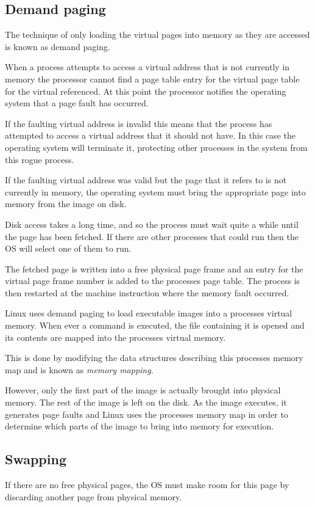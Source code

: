 \documentclass[a4paper,12pt]{book}
\begin{document}
\subsection{Demand paging}
The technique of only loading the virtual
pages into memory as they are accessed is known as demand paging. 

When a process attempts to access a virtual address that is not currently in
memory the processor cannot find a page table entry for the virtual page table
for the virtual referenced. At this point the processor notifies the operating
system that a page fault has occurred.

If the faulting virtual address is invalid this means that the process has
attempted to access a virtual address that it should not have. In this case
the operating system will terminate it, protecting other processes in the
system from this rogue process.

If the faulting virtual address was valid but the page that it refers to is
not currently in memory, the operating system must bring the appropriate page
into memory from the image on disk.

Disk access takes a long time, and so the process must wait quite a while until
the page has been fetched. If there are other processes that could run then the
OS will select one of them to run. 

The fetched page is written into a free physical page frame and an entry for the
virtual page frame number is added to the processes page table. The process is
then restarted at the machine instruction where the memory fault occurred. 

Linux uses demand paging to load executable images into a processes virtual
memory. When ever a command is executed, the file containing it is opened and
its contents are mapped into the processes virtual memory. 

This is done by modifying the data structures describing this processes memory
map and is known as \emph{memory mapping}.

However, only the first part of the image is actually brought into physical
memory. The rest of the image is left on the disk. As the image executes, it
generates page faults and Linux uses the processes memory map in order to
determine which parts of the image to bring into memory for execution. 

\subsection{Swapping}
If there are no free physical pages, the OS must make room for this page by
discarding another page from physical memory.
\end{document}
